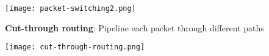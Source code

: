 \documentclass[12pt]{article}
\begin{document}
\begin{spacing}{1.5}
\begin{itemize*}
		\vspace{0.2cm}
		\texttt{[image: packet-switching2.png]}
	
	\item \textbf{Cut-through routing}: Pipeline each packet through different paths
	
	\texttt{[image: cut-through-routing.png]}
	
\end{itemize*}

\end{spacing}
\end{document}
